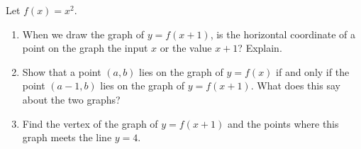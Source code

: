 Let $f(x)=x^2$.
\begin{enumerate}
\item[(a)] When we draw the graph of $y=f(x+1)$, is the horizontal coordinate of a point on the graph the input $x$ or the value $x+1$? Explain.
\item[(b)] Show that a point $(a,b)$ lies on the graph of $y=f(x)$ if and only if the point $(a-1,b)$ lies on the graph of $y=f(x+1)$. What does this say about the two graphs?
\item[(c)] Find the vertex of the graph of $y=f(x+1)$ and the points where this graph meets the line $y=4$.
\end{enumerate}
